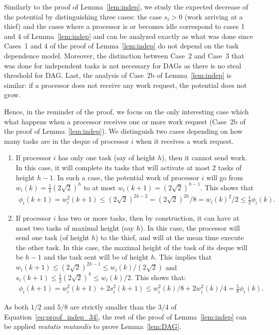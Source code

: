 \begin{pf}
  Similarly to the proof of Lemma~\ref{lem:indep}, we study the
  expected decrease of the potential by distinguishing three cases:
  the case $s_i>0$ (work arriving at a thief) and the cases where a
  processor is or becomes idle correspond to cases 1 and 4 of
  Lemma~\ref{lem:indep} and can be analyzed exactly as what was done
  since Cases~1 and 4 of the proof of Lemma~\ref{lem:indep} do not
  depend on the task dependence model.  Moreover, the distinction
  between Case~2 and Case~3 that was done for independent tasks is not
  necessary for DAGs as there is no steal threshold for DAG. Last, the
  analysis of Case~2b of Lemma~\ref{lem:indep} is similar: if a
  processor does not receive any work request, the potential does not
  grow.

  Hence, in the reminder of the proof, we focus on the only
  interesting case which what happens when a processor receives one or
  more work request (Case~2b of the proof of Lemma~\ref{lem:indep}).
  We distinguish two cases depending on how many tasks are in the
  deque of processor $i$ when it receives a work request.
  \begin{enumerate}
  \item If processor $i$ has only one task (say of height $h$), then
    it cannot send work. In this case, it will complete
    its tasks that will activate at most $2$ tasks of height $h-1$. In
    such a case, the potential work of processor $i$ will go from
    $w_i(k)=\frac12(2\sqrt{2})^h$ to at most
    $w_i(k+1)=(2\sqrt{2})^{h-1}$. This shows that 
    \begin{align*}
      \phi_i(k+1) = w^2_i(k+1)\le (2\sqrt{2})^{2h-2} = (2\sqrt{2})^{2h}/8 
      = w_i(k)^2/2 \le \frac12 \phi_i(k). 
    \end{align*}
  \item If processor $i$ has two or more tasks, then by construction,
    it can have at most two tasks of maximal height (say $h$). In this
    case, the processor will send one task (of height $h$) to the
    thief, and will at the mean time execute the other task. In this
    case, the maximal height of the task of its deque will be $h-1$
    and the task sent will be of height $h$. This implies that
    $w_i(k+1)\le (2\sqrt{2})^{2h-1}\le w_i(k)/(2\sqrt2)$ and
    $s_i(k+1)\le \frac12(2\sqrt{2})^{h}\le w_i(k)/2$. This shows
    that:
    \begin{align*}
      \phi_i(k+1) = w^2_i(k+1)+2s^2_i(k+1) \le w^2_i(k)/8 + 2w^2_i(k)/4 
      = \frac58 \phi_i(k). 
    \end{align*}
  \end{enumerate}
  As both $1/2$ and $5/8$ are strictly smaller than the $3/4$ of
  Equation~\eqref{eq:proof_indep_34}, the rest of the proof of
  Lemma~\ref{lem:indep} can be applied \emph{mutatis mutandis} to
  prove Lemma~\ref{lem:DAG}.
\end{pf}

